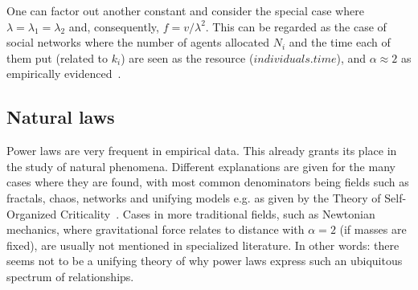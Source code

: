 \documentclass[10pt,letterpaper]{article}
\begin{document}
One can factor out another constant and consider the special case where $\lambda=\lambda_1=\lambda_2$ and, consequently, $f=v/\lambda^2$.
This can be regarded as the case of social networks where the number of agents allocated $N_i$ and the time each of them put (related to $k_i$) are seen as the resource ($individuals . time$), and $\alpha\approx 2$
as empirically evidenced~\cite{newman}.

% 

\subsection{Natural laws}

Power laws are very frequent in empirical data.
This already grants its place in the study of natural phenomena.
Different explanations are given for the many cases where
they are found, with most common denominators being fields such as
fractals, chaos, networks and unifying models e.g. as given by the Theory of Self-Organized Criticality~\cite{part}.
Cases in more traditional fields, such as Newtonian mechanics, where gravitational force relates to distance with $\alpha=2$ (if masses are fixed), are usually not mentioned in specialized literature.
In other words: there seems not to be a unifying theory of why power laws express such
an ubiquitous spectrum of relationships.
\end{document}
